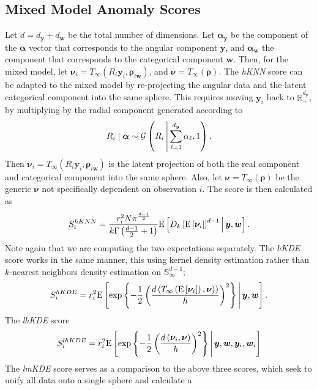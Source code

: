 \subsection{Mixed Model Anomaly Scores\label{sec:mixedscores}}
Let $d = d_{\bm{y}} + d_{\bm{w}}$ be the total number of dimensions.  Let 
    $\bm{\alpha}_{\bm{y}}$ be the component of the $\bm{\alpha}$ vector that 
    corresponds  to the angular component $\bm{y}$, and $\bm{\alpha}_{\bm{w}}$ 
    the component that corresponds to the categorical component $\bm{w}$.
    Then, for the mixed model, let 
    $\bm{\nu}_i = T_{\infty}(R_i\bm{y}_i, \bm{\rho}_{i\bm{w}})$, and 
    $\bm{\nu} = T_{\infty}(\bm{\rho})$.  The \emph{hKNN} score can be adapted 
    to the mixed model by re-projecting the angular data and the latent 
    categorical component into the same sphere. This requires moving $\bm{y}_i$ 
    back to $\mathbb{R}_+^{d_{\bm{y}}}$, by multiplying by the radial component
    generated according to
    \[
        R_i\mid\bm{\alpha} \sim \mathcal{G}
        \left(R_i\,\middle\vert\,\sum_{\ell = 1}^{d_{\bm{y}}}\alpha_{\ell}, 1\right).
    \]
    Then $\bm{\nu}_i = T_{\infty}(R_i\bm{y}_i, \bm{\rho}_{i\bm{w}})$ is the 
    latent projection of both the real component and categorical component into 
    the same sphere.  Also, let $\bm{\nu} = T_{\infty}(\bm{\rho})$ be the 
    generic $\bm{\nu}$ not specifically dependent on observation $i$.  The 
    score is then calculated as
    \[
        S_i^{hKNN} = \frac{r_i^2 N\pi^{\frac{d-1}{2}}}{
                k\Gamma\left(\frac{d-1}{2} + 1\right)}
        \text{E}\left[D_{k}\left[\text{E}\left[\bm{\nu}_i\right]\right]^{d-1}\,\middle\vert\,\bm{y},\bm{w}\right].
    \]
    Note again that we are computing the two expectations separately.  The 
    \emph{hKDE} score works in the same manner, this using kernel density 
    estimation rather than $k$-nearest neighbors density estimation on 
    $\mathbb{S}_{\infty}^{d-1}$;
    \[
        S_i^{hKDE} = r_i^2 \text{E}\left[\exp\left\lbrace -\frac{1}{2}
            \left(
            \frac{d\left(T_{\infty}
                \left(\text{E}\left[\bm{\nu}_i\right]\right), \bm{\nu})\right)}{h}
            \right)^2
            \right\rbrace \,\middle\vert\, \bm{y},\bm{w}
            \right].
    \]
    The \emph{lhKDE} score 
    \[
    S_i^{lhKDE} = r_i^2 \text{E}\left[\exp\left\lbrace-\frac{1}{2}\left(
        \frac{d\left(\bm{\nu}_i, \bm{\nu}\right)}{h}\right)^2\right\rbrace
        \,\middle\vert\, \bm{y},\bm{w},\bm{y}_i,\bm{w}_i\right]
    \]
    The \emph{lmKDE} score serves as a comparison to the above three scores, 
    which seek to unify all data onto a single sphere and calculate a 
